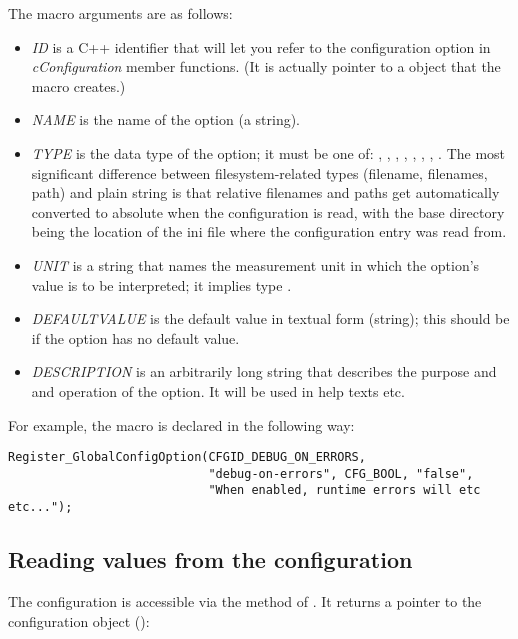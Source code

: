 The macro arguments are as follows:
\begin{itemize}
  \item \textit{ID} is a C++ identifier that will let you refer to
        the configuration option in \textit{cConfiguration} member functions.
        (It is actually pointer to a  object that
        the macro creates.)
  \item \textit{NAME} is the name of the option (a string).
  \item \textit{TYPE} is the data type of the option; it must be one of:
        , , , ,
        , , , .
        The most significant difference between filesystem-related types
        (filename, filenames, path) and plain string is that relative
        filenames and paths get automatically converted to absolute
        when the configuration is read, with the base directory being the
        location of the ini file where the configuration entry was read from.
  \item \textit{UNIT} is a string that names the measurement unit in which
        the option's value is to be interpreted; it implies type .
  \item \textit{DEFAULTVALUE} is the default value in textual form (string);
        this should be  if the option has no default value.
  \item \textit{DESCRIPTION} is an arbitrarily long string that describes
        the purpose and and operation of the option. It will be used in
        help texts etc.
\end{itemize}

For example, the  macro is declared in the following way:

\begin{verbatim}
Register_GlobalConfigOption(CFGID_DEBUG_ON_ERRORS,
                            "debug-on-errors", CFG_BOOL, "false",
                            "When enabled, runtime errors will etc etc...");
\end{verbatim}


\subsection{Reading values from the configuration}

The configuration is accessible via the  method of .
It returns a pointer to the configuration object ():

